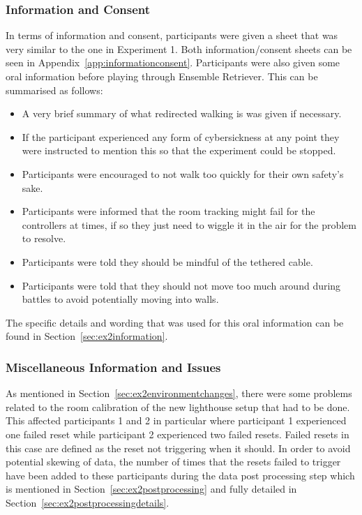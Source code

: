\subsubsection{Information and Consent}
In terms of information and consent, participants were given a sheet that was very similar to the one in Experiment 1. Both information/consent sheets can be seen in Appendix~\ref{app:informationconsent}. Participants were also given some oral information before playing through Ensemble Retriever. This can be summarised as follows:
\begin{itemize}
    \item A very brief summary of what redirected walking is was given if necessary.
    \item If the participant experienced any form of cybersickness at any point they were instructed to mention this so that the experiment could be stopped.
    \item Participants were encouraged to not walk too quickly for their own safety's sake.
    \item Participants were informed that the room tracking might fail for the controllers at times, if so they just need to wiggle it in the air for the problem to resolve.
    \item Participants were told they should be mindful of the tethered cable.
    \item Participants were told that they should not move too much around during battles to avoid potentially moving into walls. 
\end{itemize}

The specific details and wording that was used for this oral information can be found in Section~\ref{sec:ex2information}.

\subsubsection{Miscellaneous Information and Issues}
As mentioned in Section~\ref{sec:ex2environmentchanges}, there were some problems related to the room calibration of the new lighthouse setup that had to be done. This affected participants 1 and 2 in particular where participant 1 experienced one failed reset while participant 2 experienced two failed resets. Failed resets in this case are defined as the reset not triggering when it should. In order to avoid potential skewing of data, the number of times that the resets failed to trigger have been added to these participants during the data post processing step which is mentioned in Section~\ref{sec:ex2postprocessing} and fully detailed in Section~\ref{sec:ex2postprocessingdetails}. 

